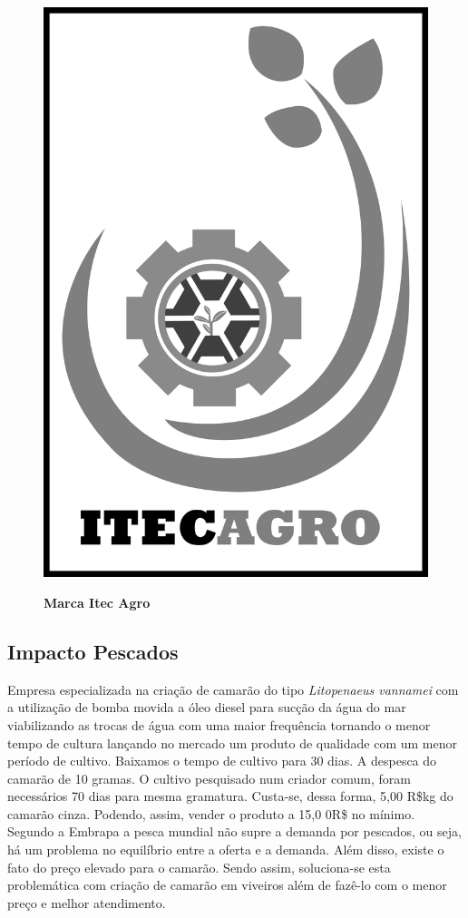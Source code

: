 \begin{figure}[!htb]
\centering
\caption{\textbf{Marca Itec Agro}}
\includegraphics[scale=0.05]{Imagens/itecagro.png}
\label{figura_46}
\end{figure}
\newpage


\subsection{Impacto Pescados}

Empresa especializada na criação de camarão do tipo \textit{Litopenaeus vannamei} com a utilização de bomba movida a óleo diesel para sucção da água do mar viabilizando as trocas de água com uma maior frequência tornando o menor tempo de cultura lançando no mercado um produto de qualidade com um menor período de cultivo. Baixamos o tempo de cultivo para 30 dias. A despesca do camarão de 10 gramas. O cultivo pesquisado num criador comum, foram necessários 70 dias para mesma gramatura. Custa-se, dessa forma, 5,00 R\$kg do camarão cinza. Podendo, assim, vender o produto a 15,0 0R\$ no mínimo. Segundo a Embrapa a pesca mundial não supre a demanda por pescados, ou seja, há um problema no equilíbrio entre a oferta e a demanda. Além disso, existe o fato do preço elevado para o camarão. Sendo assim, soluciona-se esta problemática com criação de camarão em viveiros além de fazê-lo com o menor preço e melhor atendimento.

